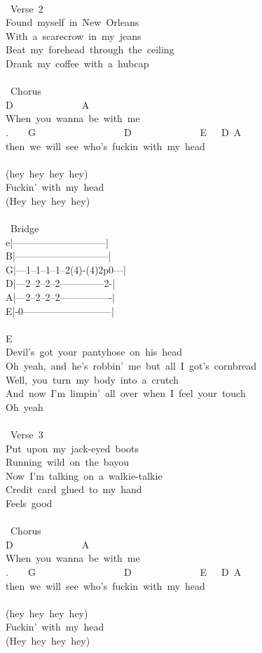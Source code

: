 {\\
\lbrack\ Verse\ 2\rbrack\\
Found\ myself\ in\ New\ Orleans\\
With\ a\ scarecrow\ in\ my\ jeans\\
Beat\ my\ forehead\ through\ the\ ceiling\\
Drank\ my\ coffee\ with\ a\ hubcap\\
\\
\lbrack\ Chorus\rbrack\\
D\ \ \ \ \ \ \ \ \ \ \ \ \ \ A\\
When\ you\ wanna\ be\ with\ me\\
.\ \ \ \ G\ \ \ \ \ \ \ \ \ \ \ \ \ \ \ \ \ \ D\ \ \ \ \ \ \ \ \ \ \ \ \ \ E\ \ \ D\ A\\
then\ we\ will\ see\ who's\ fuckin\ with\ my\ head\\
\\
(hey\ hey\ hey\ hey)\\
Fuckin'\ with\ my\ head\\
(Hey\ hey\ hey\ hey)\\
\\
\lbrack\ Bridge\rbrack\\
e|-----------------------------|\\
B|-----------------------------|\\
G|---1--1--1--1--2(4)-(4)2p0---|\\
D|---2--2--2--2--------------2-|\\
A|---2--2--2--2----------------|\\
E|-0---------------------------|\\
\\
E\\
Devil's\ got\ your\ pantyhose\ on\ his\ head\\
Oh\ yeah,\ and\ he's\ robbin'\ me\ but\ all\ I\ got's\ cornbread\\
Well,\ you\ turn\ my\ body\ into\ a\ crutch\\
And\ now\ I'm\ limpin'\ all\ over\ when\ I\ feel\ your\ touch\\
Oh\ yeah\\
\\
\lbrack\ Verse\ 3\rbrack\\
Put\ upon\ my\ jack-eyed\ boots\\
Running\ wild\ on\ the\ bayou\\
Now\ I'm\ talking\ on\ a\ walkie-talkie\\
Credit\ card\ glued\ to\ my\ hand\\
Feels\ good\\
\\
\lbrack\ Chorus\rbrack\\
D\ \ \ \ \ \ \ \ \ \ \ \ \ \ A\\
When\ you\ wanna\ be\ with\ me\\
.\ \ \ \ G\ \ \ \ \ \ \ \ \ \ \ \ \ \ \ \ \ \ D\ \ \ \ \ \ \ \ \ \ \ \ \ \ E\ \ \ D\ A\\
then\ we\ will\ see\ who's\ fuckin\ with\ my\ head\\
\\
(hey\ hey\ hey\ hey)\\
Fuckin'\ with\ my\ head\\
(Hey\ hey\ hey\ hey)}

